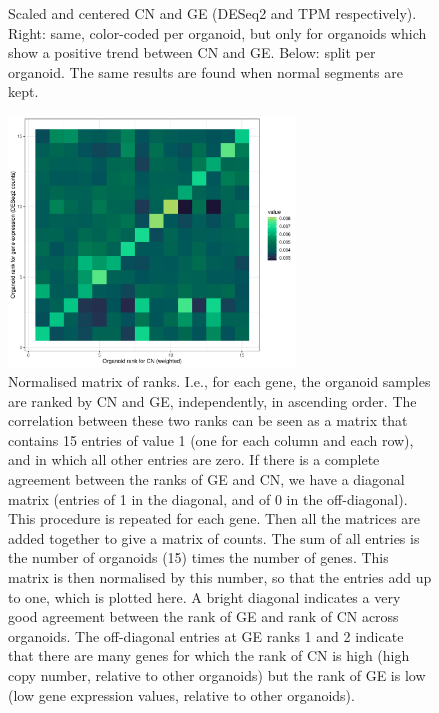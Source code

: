 \documentclass{article}
\begin{document}
\begin{figure}[h]
\caption{Scaled and centered CN and GE (DESeq2 and TPM respectively). Right: same, color-coded per organoid, but only for organoids which show a positive trend between CN and GE. Below: split per organoid. The same results are found when normal segments are kept. \label{fig:scaled_CN_GE}} %
\end{figure}


\begin{figure}[h]
\centering
\includegraphics[width=3in]{../../RNASeq_and_CN/figures/rankplot_CNweighted_deseq.pdf}
\caption{Normalised matrix of ranks. I.e., for each gene, the organoid samples are ranked by CN and GE,  independently,  in ascending order. The correlation between these two ranks can be seen as a matrix that contains 15 entries of value 1 (one for each column and each row), and in which all other entries are zero. If there is a complete agreement between the ranks of GE and CN, we have a diagonal matrix (entries of 1 in the diagonal, and of 0 in the off-diagonal). This procedure is repeated for each gene. Then all the matrices are added together to give a matrix of counts. The sum of all entries is the number of organoids (15) times the number of genes. This matrix is then normalised by this number, so that the entries add up to one, which is plotted here. A bright diagonal indicates a very good agreement between the rank of GE and rank of CN across organoids.\label{fig:rank_CN_GE} The off-diagonal entries at GE ranks 1 and 2 indicate that there are many genes for which the rank of CN is high (high copy number, relative to other organoids) but the rank of GE is low (low gene expression values, relative to other organoids).}
\end{figure}
\end{document}
